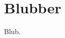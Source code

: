 

\newcommand{\SUBJECT}{Report}
\newcommand{\TITLE}{Cloud Infrastructre Lab 2}



\section{Blubber}

Blub.


